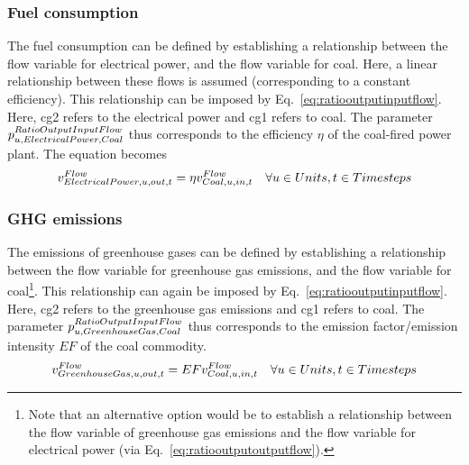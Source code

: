 \subsubsection{Fuel consumption}
The fuel consumption can be defined by establishing a relationship between the flow variable for electrical power, and the flow variable for coal. Here, a linear relationship between these flows is assumed (corresponding to a constant efficiency). This relationship can be imposed by Eq.~\eqref{eq:ratiooutputinputflow}. Here, cg2 refers to the electrical power and cg1 refers to coal. The parameter $\pRatioOutputInputFlow[u,ElectricalPower,Coal]$ thus corresponds to the efficiency $\eta$ of the coal-fired power plant. The equation becomes
\begin{align}
\vFlow[ElectricalPower,u,out,t] = \eta \vFlow[Coal,u,in,t] \quad \forall \units, \timesteps
\end{align}

\subsubsection{GHG emissions}
The emissions of greenhouse gases can be defined by establishing a relationship between the flow variable for greenhouse gas emissions, and the flow variable for coal\footnote{Note that an alternative option would be to establish a relationship between the flow variable of greenhouse gas emissions and the flow variable for electrical power (via Eq.~\eqref{eq:ratiooutputoutputflow}).}. This relationship can again be imposed by Eq.~\eqref{eq:ratiooutputinputflow}. Here, cg2 refers to the greenhouse gas emissions and cg1 refers to coal. The parameter $\pRatioOutputInputFlow[u,GreenhouseGas,Coal]$ thus corresponds to the emission factor/emission intensity $EF$ of the coal commodity. 
\begin{align}
\vFlow[GreenhouseGas,u,out,t] =  EF \vFlow[Coal,u,in,t] \quad \forall \units, \timesteps
\end{align}

